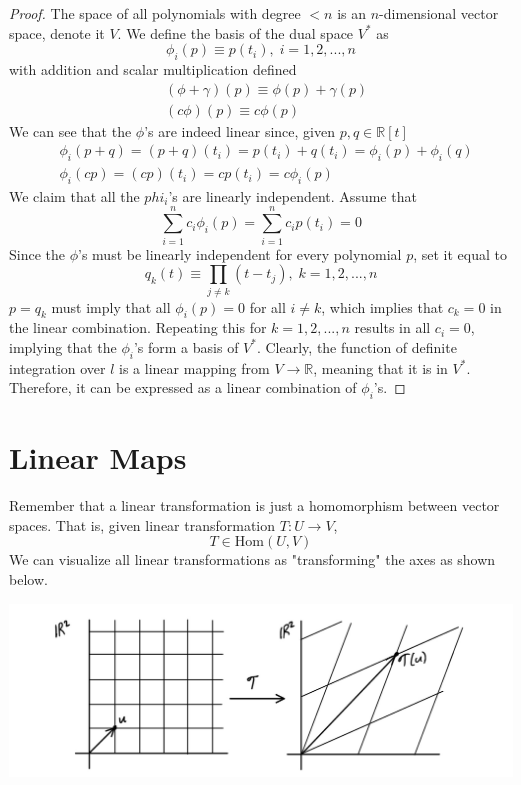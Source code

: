 \documentclass{article}
\theoremstyle{remark}
\theoremstyle{definition}
\begin{document}
\begin{proof}
The space of all polynomials with degree $< n$ is an $n$-dimensional vector space, denote it $V$. We define the basis of the dual space $V^*$ as 
\[\phi_i (p) \equiv p(t_i), \; i = 1, 2, ..., n\]
with addition and scalar multiplication defined
\begin{align*}
    & (\phi + \gamma) (p) \equiv \phi(p) + \gamma(p) \\
    & (c \phi) (p) \equiv c \phi (p) 
\end{align*}
We can see that the $\phi$'s are indeed linear since, given $p, q \in \mathbb{R}[t]$
\begin{align*}
    & \phi_i (p + q) = (p + q) (t_i) = p(t_i) + q(t_i) = \phi_i (p) + \phi_i (q) \\
    & \phi_i (c p) = (c p) (t_i) = c p(t_i) = c \phi_i (p)
\end{align*}
We claim that all the $phi_i$'s are linearly independent. Assume that \[\sum_{i=1}^n c_i \phi_i (p) = \sum_{i=1}^n c_i p(t_i) = 0\]
Since the $\phi$'s must be linearly independent for every polynomial $p$, set it equal to
\[q_k (t) \equiv \prod_{j \neq k} (t - t_j), \; k = 1, 2, ..., n\]
$p = q_k$ must imply that all $\phi_i (p) = 0$ for all $i \neq k$, which implies that $c_k = 0$ in the linear combination. Repeating this for $k = 1, 2, ..., n$ results in all $c_i = 0$, implying that the $\phi_i$'s form a basis of $V^*$. Clearly, the function of definite integration over $l$ is a linear mapping from $V \longrightarrow \mathbb{R}$, meaning that it is in $V^*$. Therefore, it can be expressed as a linear combination of $\phi_i$'s. 
\end{proof}

\section{Linear Maps}
Remember that a linear transformation is just a homomorphism between vector spaces. That is, given linear transformation $T: U \longrightarrow V$, 
\[T \in \text{Hom}(U,V)\]
We can visualize all linear transformations as "transforming" the axes as shown below. 
\begin{center}
    \includegraphics[scale=0.25]{Images/Linear_Map.PNG}
\end{center}
\end{document}
